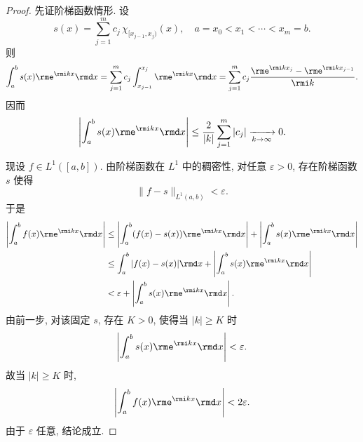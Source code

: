 \begin{proof}
    先证阶梯函数情形. 设
    \begin{equation}
        s(x)=\sum_{j=1}^{m} c_{j}\,\chi_{[x_{j-1},x_{j})}(x), \quad a=x_{0}<x_{1}<\cdots <x_{m}=b.
    \end{equation}
    则
    \begin{equation}
        \int_{a}^{b} s(x)\rme^{\rmi kx}\rmd x
        =\sum_{j=1}^{m} c_{j}\int_{x_{j-1}}^{x_{j}} \rme^{\rmi kx}\rmd x
        =\sum_{j=1}^{m} c_{j}\frac{\rme^{\rmi kx_{j}}-\rme^{\rmi kx_{j-1}}}{\rmi k}.
    \end{equation}
    因而
    \begin{equation}
        \left|\int_{a}^{b} s(x)\rme^{\rmi kx}\rmd x\right|
        \leq \frac{2}{|k|}\sum_{j=1}^{m}|c_{j}| \xrightarrow[k\to\infty]{} 0.
    \end{equation}

    现设 $f\in L^{1}([a,b])$. 由阶梯函数在 $L^{1}$ 中的稠密性, 对任意 $\varepsilon>0$, 存在阶梯函数 $s$ 使得
    \begin{equation}
        \|f-s\|_{L^{1}(a,b)}<\varepsilon.
    \end{equation}
    于是
    \begin{equation}
        \begin{aligned}
            \left|\int_{a}^{b} f(x)\rme^{\rmi kx}\rmd x\right|
             & \leq \left|\int_{a}^{b} (f(x)-s(x))\rme^{\rmi kx}\rmd x\right| + \left|\int_{a}^{b} s(x)\rme^{\rmi kx}\rmd x\right| \\
             & \leq \int_{a}^{b} |f(x)-s(x)|\rmd x + \left|\int_{a}^{b} s(x)\rme^{\rmi kx}\rmd x\right|                            \\
             & < \varepsilon + \left|\int_{a}^{b} s(x)\rme^{\rmi kx}\rmd x\right|.
        \end{aligned}
    \end{equation}
    由前一步, 对该固定 $s$, 存在 $K>0$, 使得当 $|k|\geq K$ 时
    \begin{equation}
        \left|\int_{a}^{b} s(x)\rme^{\rmi kx}\rmd x\right|<\varepsilon.
    \end{equation}
    故当 $|k|\geq K$ 时,
    \begin{equation}
        \left|\int_{a}^{b} f(x)\rme^{\rmi kx}\rmd x\right|<2\varepsilon.
    \end{equation}
    由于 $\varepsilon$ 任意, 结论成立.
\end{proof}